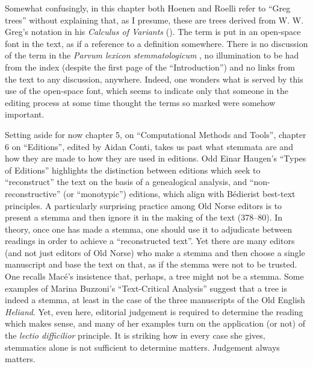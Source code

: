 \begin{review}
Somewhat confusingly, in this chapter both Hoenen and Roelli
refer to ``Greg trees'' without explaining that, as I presume, these are
trees derived from W. W. Greg's notation in his \emph{Calculus of
Variants} (\citeyear{greg_calculus_1927}). The term is put in an open-space font in the text, as
if a reference to a definition somewhere. There is no discussion of the
term in the \emph{Parvum lexicon stemmatologicum} \parencite{roelli_parvum_2015}, no illumination to be had from the index (despite the first page
of the ``Introduction'') and no links from the text to any discussion,
anywhere. Indeed, one wonders what is served by this use of the
open-space font, which seems to indicate only that someone in the
editing process at some time thought the terms so marked were somehow
important.

Setting aside for now chapter 5, on ``Computational Methods and
Tools'', chapter 6 on ``Editions'', edited by Aidan Conti, takes us past
what stemmata are and how they are made to how they are used in
editions. Odd Einar Haugen's ``Types of Editions'' highlights the
distinction between editions which seek to ``reconstruct'' the text on
the basis of a genealogical analysis, and ``non-reconstructive'' (or
``monotypic'') editions, which align with Bédierist best-text
principles. A particularly surprising practice among Old Norse editors
is to present a stemma and then ignore it in the making of the text
(378--80). In theory, once one has made a stemma, one should use it to
adjudicate between readings in order to achieve a ``reconstructed
text''. Yet there are many editors (and not just editors of Old Norse)
who make a stemma and then choose a single manuscript and base the text
on that, as if the stemma were not to be trusted. One recalls Macé's
insistence that, perhaps, a tree might not be a stemma. Some examples of
Marina Buzzoni's ``Text-Critical Analysis'' suggest that a tree is
indeed a stemma, at least in the case of the three manuscripts of the
Old English \emph{Heliand}. Yet, even here, editorial judgement is
required to determine the reading which makes sense, and many of her
examples turn on the application (or not) of the \emph{lectio
difficilior} principle. It is striking how in every case she gives,
stemmatics alone is not sufficient to determine matters. Judgement
always matters.


\end{review}
